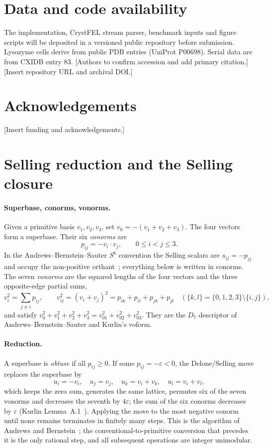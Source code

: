 \documentclass[11pt]{article}
\begin{document}
\section*{Data and code availability}
The implementation, CrystFEL stream parser, benchmark inputs and figure scripts will be deposited in a versioned public repository before submission. Lysozyme cells derive from public PDB entries (UniProt P00698). Serial data are from CXIDB entry 83. [Authors to confirm accession and add primary citation.] [Insert repository URL and archival DOI.]

\section*{Acknowledgements}
[Insert funding and acknowledgements.]

\appendix

\section{Selling reduction and the Selling closure}
\label{app:closure}

\paragraph{Superbase, conorms, vonorms.}
Given a primitive basis $v_1,v_2,v_3$, set $v_0=-(v_1+v_2+v_3)$. The four vectors form a superbase. Their six \emph{conorms} are
\[
p_{ij}=-v_i\cdot v_j,\qquad 0\le i<j\le3 .
\]
In the Andrews--Bernstein--Sauter $S^6$ convention the Selling scalars are $s_{ij}=-p_{ij}$ and occupy the non-positive orthant~\cite{abs2019}; everything below is written in conorms. The seven \emph{vonorms} are the squared lengths of the four vectors and the three opposite-edge partial sums,
\[
v_i^2=\sum_{j\ne i}p_{ij},\qquad v_{ij}^2=(v_i+v_j)^2=p_{ik}+p_{il}+p_{jk}+p_{jl}\quad(\{k,l\}=\{0,1,2,3\}\setminus\{i,j\}),
\]
and satisfy $v_0^2+v_1^2+v_2^2+v_3^2=v_{01}^2+v_{02}^2+v_{03}^2$. They are the $D_7$ descriptor of Andrews--Bernstein--Sauter and Kurlin's voform.

\paragraph{Reduction.}
A superbase is \emph{obtuse} if all $p_{ij}\ge0$. If some $p_{ij}=-\varepsilon<0$, the Delone/Selling move replaces the superbase by
\[
u_i=-v_i,\quad u_j=v_j,\quad u_k=v_i+v_k,\quad u_l=v_i+v_l,
\]
which keeps the zero sum, generates the same lattice, permutes six of the seven vonorms and decreases the seventh by $4\varepsilon$; the sum of the six conorms decreases by $\varepsilon$ (Kurlin Lemma~A.1~\cite{kurlin2026}). Applying the move to the most negative conorm until none remains terminates in finitely many steps. This is the algorithm of Andrews and Bernstein~\cite{ab1988,ab2014,abs2019}; the conventional-to-primitive conversion that precedes it is the only rational step, and all subsequent operations are integer unimodular.
\end{document}
